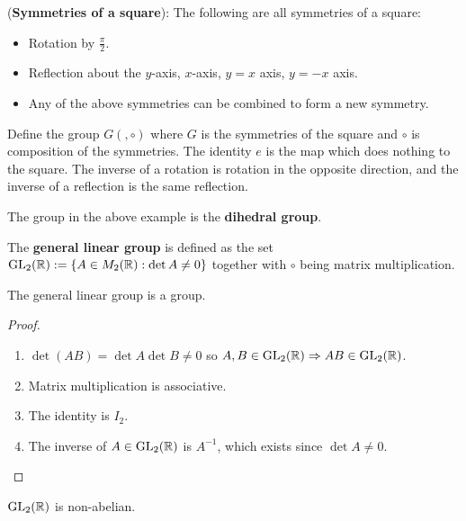 \begin{example}
	(\textbf{Symmetries of a square}): The following are all symmetries of a square:
	\begin{itemize}
		\item Rotation by $\frac{\pi}{2}$.
		\item Reflection about the $y$-axis, $x$-axis, $y = x$ axis, $y = -x$ axis.
		\item Any of the above symmetries can be combined to form a new symmetry.
	\end{itemize}
	Define the group $G(, \circ)$ where $G$ is the symmetries of the square and $\circ$ is composition of the symmetries. The identity $e$ is the map which does nothing to the square. The inverse of a rotation is rotation in the opposite direction, and the inverse of a reflection is the same reflection.
\end{example}

\begin{definition}
	The group in the above example is the \textbf{dihedral group}.
\end{definition}

\begin{definition}
	The \textbf{general linear group} is defined as the set $\text{GL}_2 (\mathbb{R}) := \{ A \in M_2 (\mathbb{R}) : \det A \ne 0 \}$ together with $\circ$ being matrix multiplication.
\end{definition}

\begin{lemma}
	The general linear group is a group.
\end{lemma}

\begin{proof}
	\hfill
	\begin{enumerate}
		\item $\det (A B) = \det A \det B \ne 0$ so $A, B \in \text{GL}_2(\mathbb{R}) \Rightarrow AB \in \text{GL}_2(\mathbb{R})$.
		\item Matrix multiplication is associative.
		\item The identity is $I_2$.
		\item The inverse of $A \in \text{GL}_2(\mathbb{R})$ is $A^{-1}$, which exists since $\det A \ne 0$.
	\end{enumerate}
\end{proof}

\begin{remark}
	$\text{GL}_2(\mathbb{R})$ is non-abelian.
\end{remark}

